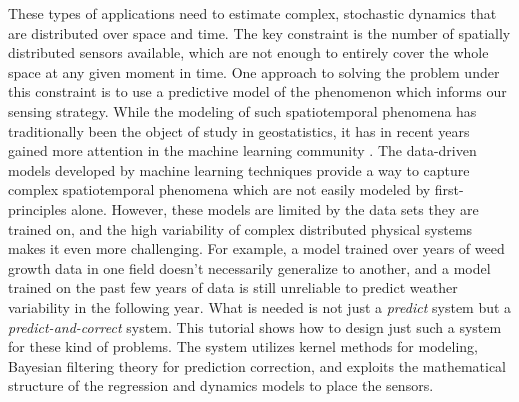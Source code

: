 These types of applications need to estimate complex, stochastic dynamics that are distributed over space and time. The key constraint is the number of spatially distributed sensors available, which are not enough to entirely cover the whole space at any given moment in time. One approach to solving the problem under this constraint is to use a predictive model of the phenomenon which informs our sensing strategy. %
While the modeling of such spatiotemporal phenomena has traditionally been the object of study in geostatistics, it has in recent years gained more attention in the machine learning community \cite{cressie2011statistics}. The data-driven models developed by machine learning techniques provide a way to capture complex spatiotemporal phenomena which are not easily modeled by first-principles alone. However, these models are limited by the data sets they are trained on, and the high variability of complex distributed physical systems makes it even more challenging. For example, a model trained over years of weed growth data in one field doesn't necessarily generalize to another, and a model trained on the past few years of data is still unreliable to predict weather variability in the following year. What is needed is not just a \textit{predict} system but a \textit{predict-and-correct} system. This tutorial shows how to design just such a system for these kind of problems. The system utilizes kernel methods for modeling, Bayesian filtering theory for prediction correction, and exploits the mathematical structure of the regression and dynamics models to place the sensors. 



